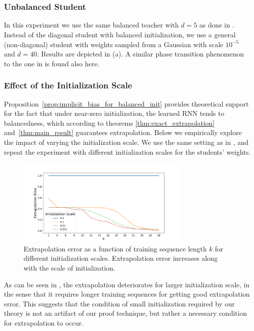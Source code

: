 \subsubsection{Unbalanced Student}\label{sec:apdx:unbalanced_student}

In this experiment we use the same balanced teacher with $\hat{d}=5$ as done in . Instead of the diagonal student with balanced initialization, we use a general (non-diagonal) student with weights sampled from a Gaussian with scale $10^{-5}$ and $d=40$. Results are depicted in (a). A similar phase transition phenomenon to the one in  is found also here.


\subsubsection{Effect of the Initialization Scale}\label{sec:largeinit}

Proposition~\ref{prop:implicit_bias_for_balanced_init} provides theoretical support for the fact that under near-zero initialization, the learned RNN tends to balancedness, which according to theorems \ref{thm:exact_extrapolation} and~\ref{thm:main_result} guarantees extrapolation.
Below we empirically explore the impact of varying the initialization scale. We use the same setting as in , and repeat the experiment with different initialization scales for the students' weights.


\begin{figure}
\centering
\includegraphics[width=0.75\textwidth]{figures/init_breaks2.png}
\caption{
Extrapolation error as a function of training sequence length $k$ for different initialization scales. Extrapolation error increases along with the scale of initialization.
}
\label{fig:init_breaks}
\end{figure}

As can be seen in , the extrapolation deteriorates for larger initialization scale, in the sense that it requires longer training sequences for getting good extrapolation error.  This suggests that the condition of small initialization required by our theory is not an artifact of our proof technique, but rather a necessary condition for extrapolation to occur.


